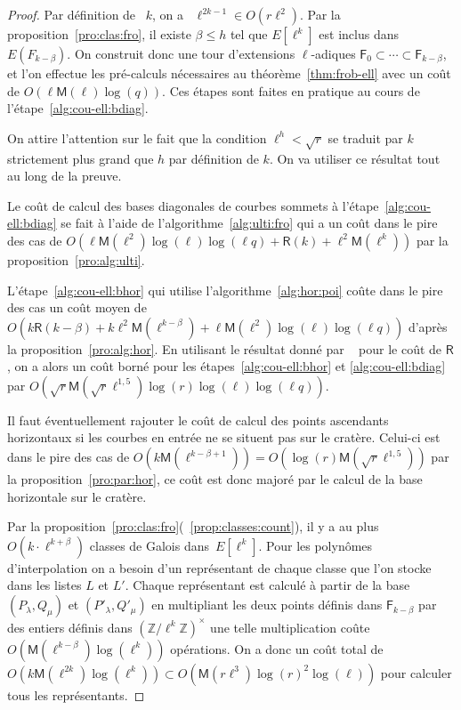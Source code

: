 \documentclass[10pt,a4paper]{book}
\theoremstyle{plain}
\theoremstyle{definition}
\theoremstyle{definition}
\theoremstyle{definition}
\theoremstyle{definition}
\theoremstyle{definition}
\theoremstyle{remark}
\theoremstyle{remark}
\theoremstyle{definition}
\begin{document}
\begin{proof}
Par définition de ~$k$, on a ~$\ell^{2k-1} \in O(r\ell^2)$.
  Par la proposition~\ref{pro:clas:fro}, il existe $\beta \leqslant h$ tel que
  $E[\ell^k]$ est inclus dans $E(F_{k-\beta})$. On construit donc une
  tour d'extensions $\ell$-adiques $\mathsf{F}_0\subset\cdots\subset 
  \mathsf{F}_{k-\beta}$, et l'on effectue les pré-calculs nécessaires au 
  théorème~\ref{thm:frob-ell} avec un coût de 
  $O(\ell\mathsf{M}(\ell)\log(q))$. Ces étapes sont faites en pratique au cours
  de l'étape~\ref{alg:cou-ell:bdiag}.
  
  On attire l'attention sur le fait que la condition $\ell^h<\sqrt{r}$ se traduit par 
  $k$ strictement plus grand que $h$ par définition de $k$.
  On va utiliser ce résultat tout au long de la preuve. 
 
  Le coût de calcul des bases diagonales de courbes sommets à 
  l'étape~\ref{alg:cou-ell:bdiag} se fait à l'aide de 
  l'algorithme~\ref{alg:ulti:fro} qui a un coût dans le pire des cas
  de 
  $O(\ell\mathsf{M}(\ell^2)\log(\ell)\log(\ell q)+\mathsf{R}(k) +  \ell^2\mathsf{M}(\ell^{k}))$ 
  par la proposition~\ref{pro:alg:ulti}. %

  L'étape~\ref{alg:cou-ell:bhor} qui utilise 
  l'algorithme~\ref{alg:hor:poi} coûte dans le pire des cas un coût moyen de
  $O(k\mathsf{R}(k-\beta) + k\ell^2\mathsf{M}(\ell^{k-\beta}) + \ell\mathsf{M}(\ell^2)\log(\ell)\log(\ell q))$ d'après la 
  proposition~\ref{pro:alg:hor}.
  En utilisant le  résultat  donné par ~\cite[Chapter~14.5]{vzGJG03} pour le 
  coût de $\mathsf{R}$, on a alors un coût borné pour les 
  étapes~\ref{alg:cou-ell:bhor} et \ref{alg:cou-ell:bdiag} par 
  $O(\sqrt{r}\mathsf{M}(\sqrt{r}\ell^{1,5})\log(r)\log(\ell)\log(\ell q))$.
  
  Il faut éventuellement rajouter le coût de calcul des points ascendants 
  horizontaux si les courbes en entrée ne se situent pas sur le cratère. 
  Celui-ci est dans le pire des cas de
  $O(k\mathsf{M}(\ell^{k-\beta+1})) = O(\log(r) \mathsf{M}(\sqrt{r} \ell^{1,5}) )$ par la proposition~\ref{pro:par:hor}, ce 
  coût est donc majoré par le calcul de la base horizontale sur le cratère.

  Par la proposition~\ref{pro:clas:fro}(~\ref{prop:classes:count}), il y a au 
  plus~$O(k \cdot \ell^{k+\beta})$ classes de Galois dans~$E[\ell^k]$. 
  Pour les polynômes d'interpolation on a besoin d'un représentant de chaque 
  classe que l'on stocke dans les listes $L$ et $L'$. Chaque représentant est
  calculé à partir de la base $(P_{\lambda},Q_{\mu})$ et $(P'_{\lambda},
  Q'_{\mu})$ en multipliant les deux points définis dans $\mathsf{F}_{k-\beta}$
  par des entiers définis dans $\left( \mathbb{Z}/\ell^{k}\mathbb{Z}
  \right)^{\times}$ une telle multiplication coûte $O(\mathsf{M}(\ell^{k-\beta}
  )\log(\ell^k))$ opérations. On a donc un coût total de 
  $O(k\mathsf{M}(\ell^{2k})\log(\ell^k)) \subset O(\mathsf{M}(r\ell^{3})\log(r)^2 \log(\ell))$
  pour calculer tous les représentants.
  

\end{proof}
\end{document}
